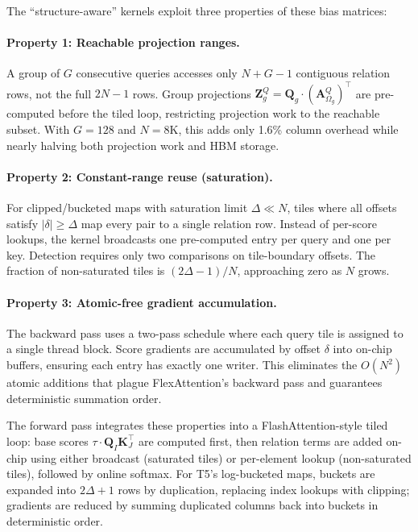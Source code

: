\documentclass[11pt,a4paper]{article}
\begin{document}
The ``structure-aware'' kernels exploit three properties of these bias matrices:

\paragraph{Property 1: Reachable projection ranges.}
A group of $G$ consecutive queries accesses only $N{+}G{-}1$ contiguous relation rows, not the full $2N{-}1$ rows. Group projections $\mathbf{Z}^Q_g = \mathbf{Q}_g \cdot (\mathbf{A}^Q_{\Omega_g})^\top$ are pre-computed before the tiled loop, restricting projection work to the reachable subset. With $G{=}128$ and $N{=}8$K, this adds only 1.6\% column overhead while nearly halving both projection work and HBM storage.

\paragraph{Property 2: Constant-range reuse (saturation).}
For clipped/bucketed maps with saturation limit $\Delta \ll N$, tiles where all offsets satisfy $|\delta| \geq \Delta$ map every pair to a single relation row. Instead of per-score lookups, the kernel broadcasts one pre-computed entry per query and one per key. Detection requires only two comparisons on tile-boundary offsets. The fraction of non-saturated tiles is $(2\Delta{-}1)/N$, approaching zero as $N$ grows.

\paragraph{Property 3: Atomic-free gradient accumulation.}
The backward pass uses a two-pass schedule where each query tile is assigned to a single thread block. Score gradients are accumulated by offset $\delta$ into on-chip buffers, ensuring each entry has exactly one writer. This eliminates the $O(N^2)$ atomic additions that plague FlexAttention's backward pass and guarantees deterministic summation order.

The forward pass integrates these properties into a FlashAttention-style tiled loop: base scores $\tau \cdot \mathbf{Q}_I \mathbf{K}_J^\top$ are computed first, then relation terms are added on-chip using either broadcast (saturated tiles) or per-element lookup (non-saturated tiles), followed by online softmax. For T5's log-bucketed maps, buckets are expanded into $2\Delta{+}1$ rows by duplication, replacing index lookups with clipping; gradients are reduced by summing duplicated columns back into buckets in deterministic order.
\end{document}

